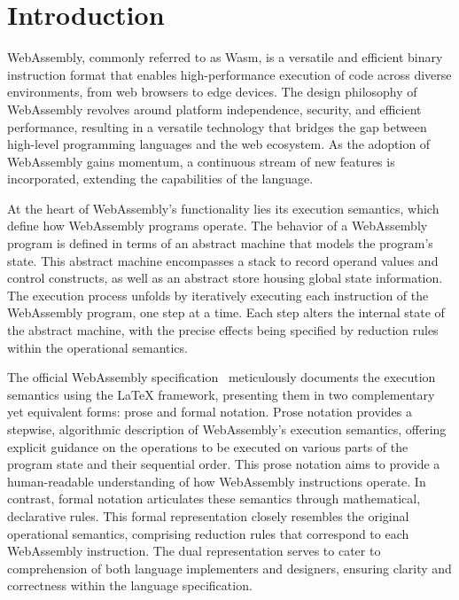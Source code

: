 \section{Introduction}\label{sec:intro}

WebAssembly, commonly referred to as Wasm, is a versatile and efficient binary
instruction format that enables high-performance execution of code across
diverse environments, from web browsers to edge devices. The design philosophy
of WebAssembly revolves around platform independence, security, and efficient
performance, resulting in a versatile technology that bridges the gap between
high-level programming languages and the web ecosystem. As the adoption of WebAssembly
gains momentum, a continuous stream of new features is incorporated, extending
the capabilities of the language.

At the heart of WebAssembly's functionality lies its execution semantics, which
define how WebAssembly programs operate. The behavior of a WebAssembly program
is defined in terms of an abstract machine that models the program's state.
This abstract machine encompasses a stack to record operand values and control
constructs, as well as an abstract store housing global state information. The
execution process unfolds by iteratively executing each instruction of the
WebAssembly program, one step at a time. Each step alters the internal state of
the abstract machine, with the precise effects being specified by reduction
rules within the operational semantics.

The official WebAssembly specification~\cite{wasmspec} meticulously documents
the execution semantics using the LaTeX framework, presenting them in two
complementary yet equivalent forms: prose and formal notation. Prose notation
provides a stepwise, algorithmic description of WebAssembly's execution
semantics, offering explicit guidance on the operations to be executed on
various parts of the program state and their sequential order. This prose
notation aims to provide a human-readable understanding of how WebAssembly
instructions operate.  In contrast, formal notation articulates these semantics
through mathematical, declarative rules. This formal representation closely
resembles the original operational semantics, comprising reduction rules that
correspond to each WebAssembly instruction. The dual representation serves to
cater to comprehension of both language implementers and designers, ensuring
clarity and correctness within the language specification.

